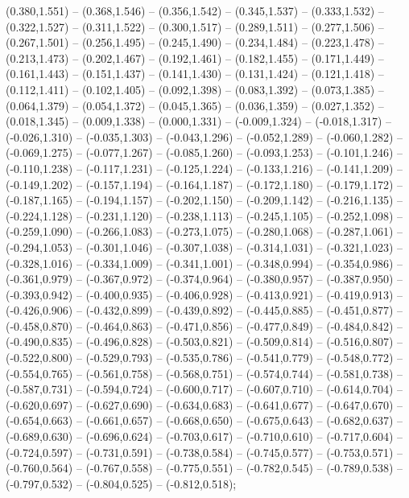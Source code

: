 (0.380,1.551) -- (0.368,1.546) -- (0.356,1.542) -- (0.345,1.537) -- (0.333,1.532) -- (0.322,1.527) -- (0.311,1.522) -- (0.300,1.517) -- (0.289,1.511) -- (0.277,1.506) -- (0.267,1.501) -- (0.256,1.495) -- (0.245,1.490) -- (0.234,1.484) -- (0.223,1.478) -- (0.213,1.473) -- (0.202,1.467) -- (0.192,1.461) -- (0.182,1.455) -- (0.171,1.449) -- (0.161,1.443) -- (0.151,1.437) -- (0.141,1.430) -- (0.131,1.424) -- (0.121,1.418) -- (0.112,1.411) -- (0.102,1.405) -- (0.092,1.398) -- (0.083,1.392) -- (0.073,1.385) -- (0.064,1.379) -- (0.054,1.372) -- (0.045,1.365) -- (0.036,1.359) -- (0.027,1.352) -- (0.018,1.345) -- (0.009,1.338) -- (0.000,1.331) -- (-0.009,1.324) -- (-0.018,1.317) -- (-0.026,1.310) -- (-0.035,1.303) -- (-0.043,1.296) -- (-0.052,1.289) -- (-0.060,1.282) -- (-0.069,1.275) -- (-0.077,1.267) -- (-0.085,1.260) -- (-0.093,1.253) -- (-0.101,1.246) -- (-0.110,1.238) -- (-0.117,1.231) -- (-0.125,1.224) -- (-0.133,1.216) -- (-0.141,1.209) -- (-0.149,1.202) -- (-0.157,1.194) -- (-0.164,1.187) -- (-0.172,1.180) -- (-0.179,1.172) -- (-0.187,1.165) -- (-0.194,1.157) -- (-0.202,1.150) -- (-0.209,1.142) -- (-0.216,1.135) -- (-0.224,1.128) -- (-0.231,1.120) -- (-0.238,1.113) -- (-0.245,1.105) -- (-0.252,1.098) -- (-0.259,1.090) -- (-0.266,1.083) -- (-0.273,1.075) -- (-0.280,1.068) -- (-0.287,1.061) -- (-0.294,1.053) -- (-0.301,1.046) -- (-0.307,1.038) -- (-0.314,1.031) -- (-0.321,1.023) -- (-0.328,1.016) -- (-0.334,1.009) -- (-0.341,1.001) -- (-0.348,0.994) -- (-0.354,0.986) -- (-0.361,0.979) -- (-0.367,0.972) -- (-0.374,0.964) -- (-0.380,0.957) -- (-0.387,0.950) -- (-0.393,0.942) -- (-0.400,0.935) -- (-0.406,0.928) -- (-0.413,0.921) -- (-0.419,0.913) -- (-0.426,0.906) -- (-0.432,0.899) -- (-0.439,0.892) -- (-0.445,0.885) -- (-0.451,0.877) -- (-0.458,0.870) -- (-0.464,0.863) -- (-0.471,0.856) -- (-0.477,0.849) -- (-0.484,0.842) -- (-0.490,0.835) -- (-0.496,0.828) -- (-0.503,0.821) -- (-0.509,0.814) -- (-0.516,0.807) -- (-0.522,0.800) -- (-0.529,0.793) -- (-0.535,0.786) -- (-0.541,0.779) -- (-0.548,0.772) -- (-0.554,0.765) -- (-0.561,0.758) -- (-0.568,0.751) -- (-0.574,0.744) -- (-0.581,0.738) -- (-0.587,0.731) -- (-0.594,0.724) -- (-0.600,0.717) -- (-0.607,0.710) -- (-0.614,0.704) -- (-0.620,0.697) -- (-0.627,0.690) -- (-0.634,0.683) -- (-0.641,0.677) -- (-0.647,0.670) -- (-0.654,0.663) -- (-0.661,0.657) -- (-0.668,0.650) -- (-0.675,0.643) -- (-0.682,0.637) -- (-0.689,0.630) -- (-0.696,0.624) -- (-0.703,0.617) -- (-0.710,0.610) -- (-0.717,0.604) -- (-0.724,0.597) -- (-0.731,0.591) -- (-0.738,0.584) -- (-0.745,0.577) -- (-0.753,0.571) -- (-0.760,0.564) -- (-0.767,0.558) -- (-0.775,0.551) -- (-0.782,0.545) -- (-0.789,0.538) -- (-0.797,0.532) -- (-0.804,0.525) -- (-0.812,0.518);
